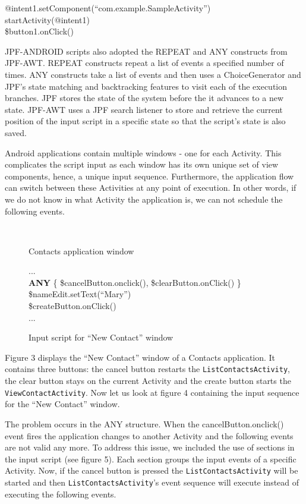\documentclass{acm_proc_article-sp}
\begin{document}
{\small
{\sf
\hspace*{4mm}@intent1.setComponent(``com.example.SampleActivity'')\\
\hspace*{4mm}startActivity(@intent1)\\
\hspace*{4mm}\$button1.onClick()
}
}

JPF-ANDROID scripts also adopted the REPEAT and ANY constructs from JPF-AWT. REPEAT constructs repeat a list of events a specified number
of times. ANY constructs take a list of events and then uses a ChoiceGenerator and JPF's state matching and backtracking features to visit
each of the execution branches. JPF stores the state of the system before the it advances to a new state. JPF-AWT uses a JPF search listener
to store and retrieve the current position of the input script in a specific state so that the script's state is also saved.

Android applications contain multiple windows - one for each Activity. This complicates the script input as each window has its own unique
set of view components, hence, a unique input sequence. Furthermore, the application flow can switch between these Activities
at any point of execution. In other words, if we do not know in what Activity the application is, we can not schedule
the following events.

\begin{figure}
\centering
{}\\
\caption{Contacts application window}
\end{figure}
\begin{figure}
{\small
{\sf
...\\
\textbf{ANY} \{ \$cancelButton.onclick(), \$clearButton.onClick()  \}
\$nameEdit.setText(``Mary'')\\
\$createButton.onClick()\\
...
}
}
\caption{Input script for ``New Contact'' window}
\end{figure}
Figure 3 displays the ``New Contact'' window of a Contacts application. It contains three
buttons: the cancel button restarts the \texttt{ListContactsActivity}, the clear button stays on the current Activity and the create 
button starts the \texttt{ViewContactActivity}. Now let us look at figure 4 containing the input sequence for the ``New Contact'' window.

The problem occurs in the ANY structure. When the cancelButton.onclick() event fires the application changes to another
Activity and the following events are not valid any more. To address this issue, we included the
use of sections in the input script (see figure 5). Each section groups the input events of a specific Activity. Now, if the cancel button
is pressed the \texttt{ListContactsActivity} will be started and then \texttt{ListContactsActivity}'s event sequence
will execute instead of executing the following events.
\end{document}
